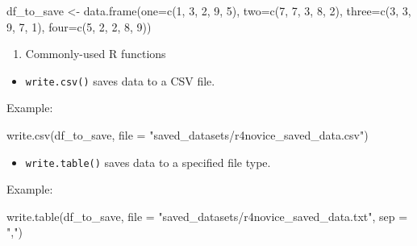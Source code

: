 \documentclass[
  letterpaper,
  DIV=11,
  numbers=noendperiod]{scrreprt}
\newenvironment{Shaded}{\begin{snugshade}}{\end{snugshade}}
\newcommand{\AttributeTok}[1]{\textcolor[rgb]{0.40,0.45,0.13}{#1}}
\newcommand{\DecValTok}[1]{\textcolor[rgb]{0.68,0.00,0.00}{#1}}
\newcommand{\FunctionTok}[1]{\textcolor[rgb]{0.28,0.35,0.67}{#1}}
\newcommand{\NormalTok}[1]{\textcolor[rgb]{0.00,0.23,0.31}{#1}}
\newcommand{\OtherTok}[1]{\textcolor[rgb]{0.00,0.23,0.31}{#1}}
\newcommand{\StringTok}[1]{\textcolor[rgb]{0.13,0.47,0.30}{#1}}
\providecommand{\tightlist}{%
  \setlength{\itemsep}{0pt}\setlength{\parskip}{0pt}}\usepackage{longtable,booktabs,array}
\begin{document}
\begin{Shaded}
\begin{Highlighting}[]
\NormalTok{df\_to\_save }\OtherTok{\textless{}{-}} \FunctionTok{data.frame}\NormalTok{(}\AttributeTok{one=}\FunctionTok{c}\NormalTok{(}\DecValTok{1}\NormalTok{, }\DecValTok{3}\NormalTok{, }\DecValTok{2}\NormalTok{, }\DecValTok{9}\NormalTok{, }\DecValTok{5}\NormalTok{),}
                         \AttributeTok{two=}\FunctionTok{c}\NormalTok{(}\DecValTok{7}\NormalTok{, }\DecValTok{7}\NormalTok{, }\DecValTok{3}\NormalTok{, }\DecValTok{8}\NormalTok{, }\DecValTok{2}\NormalTok{),}
                         \AttributeTok{three=}\FunctionTok{c}\NormalTok{(}\DecValTok{3}\NormalTok{, }\DecValTok{3}\NormalTok{, }\DecValTok{9}\NormalTok{, }\DecValTok{7}\NormalTok{, }\DecValTok{1}\NormalTok{),}
                         \AttributeTok{four=}\FunctionTok{c}\NormalTok{(}\DecValTok{5}\NormalTok{, }\DecValTok{2}\NormalTok{, }\DecValTok{2}\NormalTok{, }\DecValTok{8}\NormalTok{, }\DecValTok{9}\NormalTok{))}
\end{Highlighting}
\end{Shaded}

\begin{enumerate}
\def\labelenumi{\arabic{enumi}.}
\tightlist
\item
  Commonly-used R functions
\end{enumerate}

\begin{itemize}
\tightlist
\item
  \texttt{write.csv()} saves data to a CSV file.
\end{itemize}

Example:

\begin{Shaded}
\begin{Highlighting}[]
\FunctionTok{write.csv}\NormalTok{(df\_to\_save, }\AttributeTok{file =} \StringTok{"saved\_datasets/r4novice\_saved\_data.csv"}\NormalTok{)}
\end{Highlighting}
\end{Shaded}

\begin{itemize}
\tightlist
\item
  \texttt{write.table()} saves data to a specified file type.
\end{itemize}

Example:

\begin{Shaded}
\begin{Highlighting}[]
\FunctionTok{write.table}\NormalTok{(df\_to\_save, }\AttributeTok{file =} \StringTok{"saved\_datasets/r4novice\_saved\_data.txt"}\NormalTok{, }\AttributeTok{sep =} \StringTok{","}\NormalTok{)}
\end{Highlighting}
\end{Shaded}
\end{document}
